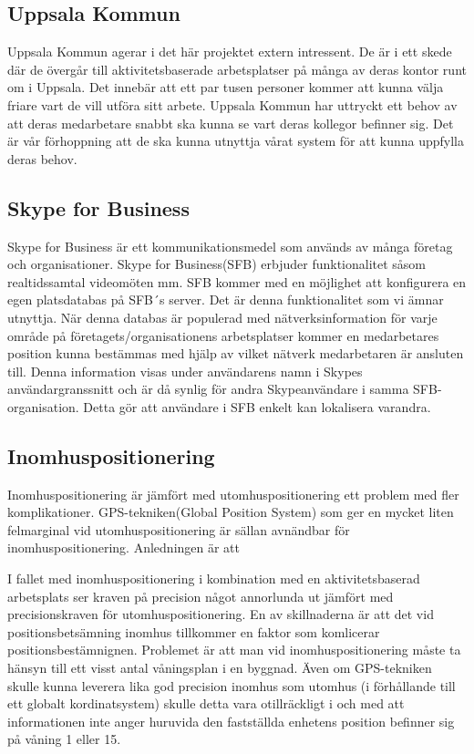 \documentclass[a4paper,12pt]{article}
\begin{document}
	\subsection{Uppsala Kommun}
  Uppsala Kommun agerar i det här projektet extern intressent. De är i ett skede där de övergår till aktivitetsbaserade arbetsplatser på många av deras kontor runt om i Uppsala. Det innebär att %
  ett par tusen personer kommer att kunna välja friare vart de vill utföra sitt arbete. Uppsala Kommun har uttryckt ett behov av att deras medarbetare snabbt ska kunna se vart deras kollegor befinner sig. Det är vår förhoppning att de ska kunna utnyttja vårat system för att kunna uppfylla deras behov.

	\subsection{Skype for Business}
    Skype for Business är ett kommunikationsmedel som används av många företag och organisationer. Skype for Business(SFB) erbjuder funktionalitet såsom realtidssamtal %
    videomöten mm. SFB kommer med en möjlighet att konfigurera en egen platsdatabas på SFB´s server.\cite{Microsoft-Office} Det är denna funktionalitet som vi ämnar utnyttja. När denna databas är populerad med nätverksinformation för varje område på företagets/organisationens arbetsplatser kommer en medarbetares position kunna bestämmas med hjälp av vilket nätverk medarbetaren är ansluten till. Denna information visas under användarens namn i Skypes användargranssnitt och är då synlig för andra Skypeanvändare i samma SFB-organisation. Detta gör att användare i SFB enkelt kan lokalisera varandra.
	\subsection{Inomhuspositionering}
    Inomhuspositionering är jämfört med utomhuspositionering ett problem med fler komplikationer. GPS-tekniken(Global Position System) som ger en mycket liten felmarginal vid utomhuspositionering är sällan avnändbar för inomhuspositionering. Anledningen är att \cite{GPS_US} %

    I fallet med inomhuspositionering i kombination med en aktivitetsbaserad arbetsplats ser kraven på precision något annorlunda ut jämfört med precisionskraven för utomhuspositionering. En av skillnaderna är att det vid positionsbetsämning inomhus tillkommer en faktor som komlicerar positionsbestämnignen. Problemet är att man vid inomhuspositionering måste ta hänsyn till ett visst antal våningsplan i en byggnad. Även om GPS-tekniken skulle kunna leverera lika god precision inomhus som utomhus (i förhållande till ett globalt kordinatsystem) skulle detta vara otillräckligt i och med att informationen inte anger huruvida den fastställda enhetens position befinner sig på våning 1 eller 15.
\end{document}
